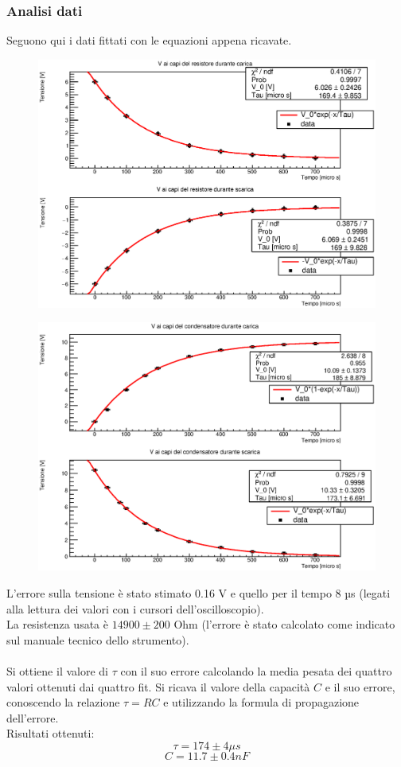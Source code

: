 \newpage
\subsubsection{Analisi dati}
Seguono qui i dati fittati con le equazioni appena ricavate.\\
%
%
    \begin{figure}[H]
    \centering
    \includegraphics[scale=0.8]{Grafici/C3_P2_RC_impulsata_resistore.eps}
    \end{figure} 
%
    \begin{figure}[H]
    \centering
    \includegraphics[scale=0.8]{Grafici/C3_P2_RC_impulsata_condensatore.eps}
    \end{figure} 
%
%
L'errore sulla tensione è stato stimato 0.16 V e quello per il tempo 8 µs (legati alla lettura dei valori con i cursori dell’oscilloscopio).\\
La resistenza usata è $14900 \pm 200$ Ohm (l'errore è stato calcolato come indicato sul manuale tecnico dello strumento).\\\\
%
%
Si ottiene il valore di $\tau$ con il suo errore calcolando la media pesata dei quattro valori ottenuti dai quattro fit.
%
Si ricava il valore della capacità $C$ e il suo errore, conoscendo la relazione $\tau = RC$ e utilizzando la formula di propagazione dell'errore.\\

Risultati ottenuti:
$$\tau = 174 \pm 4 \mu s $$
$$ C = 11.7 \pm 0.4  nF$$